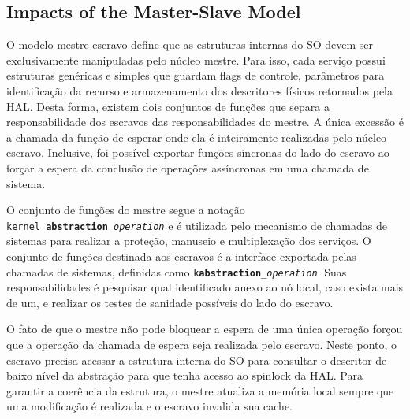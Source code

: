 

		\subsection{Impacts of the Master-Slave Model}

			O modelo mestre-escravo define que as estruturas internas do SO devem ser exclusivamente manipuladas pelo núcleo mestre.
			Para isso, cada serviço possui estruturas genéricas e simples que guardam flags de controle, parâmetros para identificação da recurso e armazenamento dos descritores físicos retornados pela HAL.
			Desta forma, existem dois conjuntos de funções que separa a responsabilidade dos escravos das responsabilidades do mestre.
			A única excessão é a chamada da função de esperar onde ela é inteiramente realizadas pelo núcleo escravo.
			Inclusive, foi possível exportar funções síncronas do lado do escravo ao forçar a espera da conclusão de operações assíncronas em uma chamada de sistema.

			O conjunto de funções do mestre segue a notação \texttt{kernel\_\textbf{abstraction}\_\textit{operation}} e é utilizada pelo mecanismo de chamadas de sistemas para realizar a proteção, manuseio e multiplexação dos serviços.
			O conjunto de funções destinada aos escravos é a interface exportada pelas chamadas de sistemas, definidas como \texttt{k\textbf{abstraction}\_\textit{operation}}.
			Suas responsabilidades é pesquisar qual identificado anexo ao nó local, caso exista mais de um, e realizar os testes de sanidade possíveis do lado do escravo.

			O fato de que o mestre não pode bloquear a espera de uma única operação forçou que a operação da chamada de espera seja realizada pelo escravo.
			Neste ponto, o escravo precisa acessar a estrutura interna do SO para consultar o descritor de baixo nível da abstração para que tenha acesso ao spinlock da HAL.
			Para garantir a coerência da estrutura, o mestre atualiza a memória local sempre que uma modificação é realizada e o escravo invalida sua cache.

